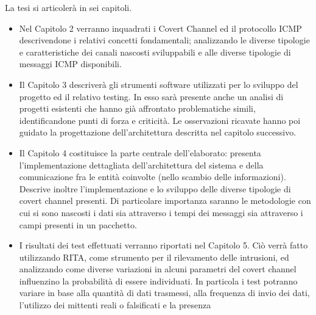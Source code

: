 \vspace{2ex} \newline 
La tesi si articolerà in sei capitoli. 
\begin{itemize} 
    \item Nel Capitolo 2 verranno inquadrati i Covert Channel ed il protocollo ICMP descrivendone i relativi concetti fondamentali; analizzando le diverse tipologie e caratteristiche 
    dei canali nascosti sviluppabili e alle diverse tipologie di messaggi ICMP disponibili.  
    \item Il Capitolo 3 descriverà gli strumenti software utilizzati per lo sviluppo del progetto ed il relativo testing. 
    In esso sarà presente anche un analisi di progetti esistenti che hanno già affrontato problematiche simili, identificandone punti di forza e criticità. 
    Le osservazioni ricavate hanno poi guidato la progettazione dell'architettura descritta nel capitolo successivo. 
    \item Il Capitolo 4 costituisce la parte centrale dell'elaborato: presenta l'implementazione dettagliata dell'architettura del sistema e della comunicazione fra le 
    entità coinvolte (nello scambio delle informazioni). Descrive inoltre l'implementazione e lo sviluppo delle diverse tipologie di covert channel presenti. 
    Di particolare importanza saranno le metodologie con cui si sono nascosti i dati sia attraverso i tempi dei messaggi sia attraverso i campi presenti in un pacchetto. 
    \item I risultati dei test effettuati verranno riportati nel Capitolo 5. Ciò verrà fatto utilizzando RITA, come strumento per il rilevamento delle intrusioni, 
    ed analizzando come diverse variazioni in alcuni parametri del covert channel influenzino la probabilità di essere individuati. 
    In particola i test potranno variare in base alla quantità di dati trasmessi, alla frequenza di invio dei dati, l'utilizzo dei mittenti reali o falsificati e la presenza 

\end{itemize}
